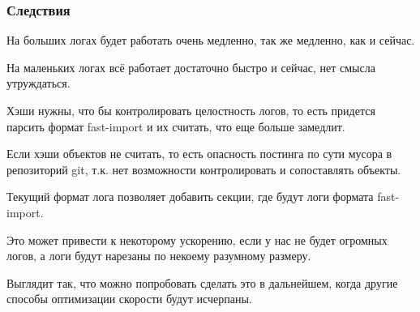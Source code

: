 \documentclass[11pt,a4paper]{article}
\begin{document}
\subsubsection*{Следствия}

На больших логах будет работать очень медленно, так же медленно, как и сейчас.

На маленьких логах всё работает достаточно быстро и сейчас, нет смысла утруждаться.

Хэши нужны, что бы контролировать целостность логов, то есть придется парсить формат fast-import
и их считать, что еще больше замедлит.

Если хэши объектов не считать, то есть опасность постинга по сути мусора в репозиторий git, т.к.
нет возможности контролировать и сопоставлять объекты.

Текущий формат лога позволяет добавить секции, где будут логи формата fast-import.

Это может привести к некоторому ускорению, если у нас не будет огромных логов, а логи будут нарезаны
по некоему разумному размеру.

Выглядит так, что можно попробовать сделать это в дальнейшем, когда другие способы оптимизации
скорости будут исчерпаны.
\end{document}
